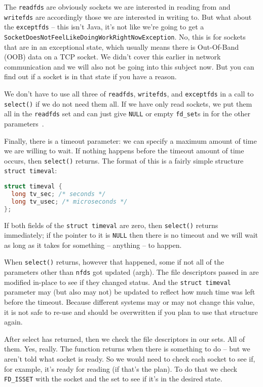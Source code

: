 The \texttt{readfds} are obviously sockets we are interested in reading from and \texttt{writefds} are accordingly those we are interested in writing to. But what about the \texttt{exceptfds} -- this isn't Java, it's not like we're going to get a \texttt{SocketDoesNotFeelLikeDoingWorkRightNowException}. No, this is for sockets that are in an exceptional state, which usually means there is Out-Of-Band (OOB) data on a TCP socket. We didn't cover this earlier in network communication and we will also not be going into this subject now. But you can find out if a socket is in that state if you have a reason.

We don't have to use all three of \texttt{readfds}, \texttt{writefds}, and \texttt{exceptfds} in a call to \texttt{select()} if we do not need them all. If we have only read sockets, we put them all in the \texttt{readfds} set and can just give \texttt{NULL} or empty \texttt{fd\_set}s in for the other parameters~\cite{getaddrinfo}.

Finally, there is a timeout parameter: we can specify a maximum amount of time we  are willing to wait. If nothing happens before the timeout amount of time occurs, then \texttt{select()} returns. The format of this is a fairly simple structure \texttt{struct timeval}:

\begin{lstlisting}[language=C]
struct timeval {
  long tv_sec; /* seconds */
  long tv_usec; /* microseconds */
};
\end{lstlisting}

If both fields of the \texttt{struct timeval} are zero, then \texttt{select()} returns immediately; if the pointer to it is \texttt{NULL} then there is no timeout and we will wait as long as it takes for something -- anything -- to happen.

When \texttt{select()} returns, however that happened, some if not all of the parameters other than \texttt{nfds} got updated (argh). The file descriptors passed in are modified in-place to see if they changed status.  And the \texttt{struct timeval} parameter may (but also may not) be updated to reflect how much time was left before the timeout. Because different systems may or may not change this value, it is not safe to re-use and should be overwritten if you plan to use that structure again.

After select has returned, then we check the file descriptors in our sets. All of them. Yes, really. The function returns when there is something to do -- but we aren't told what socket is ready. So we would need to check each socket to see if, for example, it's ready for reading (if that's the plan). To do that we check \texttt{FD\_ISSET} with the socket and the set to see if it's in the desired state.

